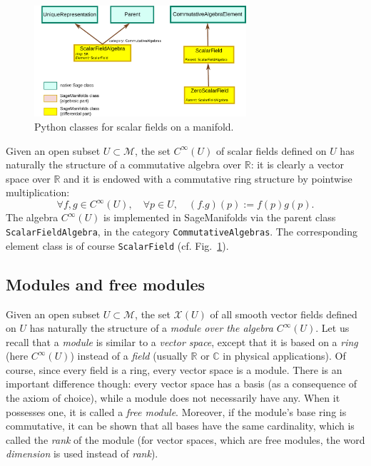 \documentclass[a4paper]{jpconf}
\newcommand{\soft}[1]{\textsf{#1}}
\newcommand{\code}[1]{\texttt{#1}}
\newcommand{\SM}{\soft{SageManifolds}}
\newcommand{\be}{\begin{equation}}
\newcommand{\ee}{\end{equation}}
\begin{document}
\begin{figure}
\begin{center}
\includegraphics[width=0.7\textwidth]{scalar_classes.pdf}
\end{center}
\caption{\label{f:scalar_classes} Python classes for scalar fields
on a manifold.}
\end{figure}

Given an open subset $U\subset\mathcal{M}$, the set $C^\infty(U)$
of scalar fields defined on $U$ has naturally the structure of a 
commutative algebra over $\mathbb{R}$: it is clearly a vector
space over $\mathbb{R}$ and it is endowed with a commutative ring structure
by pointwise multiplication:
\be
\forall f, g \in C^\infty(U),\quad \forall p\in U,\quad
(f.g)(p) := f(p) g(p) .
\ee
The algebra $C^\infty(U)$ is implemented in \SM{} via the parent
class \code{ScalarFieldAlgebra}, in the category
\code{CommutativeAlgebras}. The corresponding element class 
is of course \code{ScalarField} (cf. Fig.~\ref{f:scalar_classes}). 

\subsection{Modules and free modules} \label{s:modules}

Given an open subset $U\subset\mathcal{M}$, the set $\mathscr{X}(U)$
of all smooth vector fields defined on $U$ has naturally the structure of a 
\emph{module over the algebra} $C^\infty(U)$.
Let us recall that a \emph{module} is similar to a \emph{vector space}, except that it is based
on a \emph{ring} (here $C^\infty(U)$)
instead of a \emph{field} (usually $\mathbb{R}$ or
$\mathbb{C}$ in physical applications). Of course, since every field is a ring, every vector space is a module.
There is an important difference though: every vector space has a basis (as a 
consequence of the axiom of choice),
while a module does not necessarily have any. 
When it possesses one, it is called a \emph{free module}. 
Moreover, if the module's base ring is commutative, it can be shown that all
bases have the same
cardinality, which is called the \emph{rank} of the module 
(for vector spaces, which are free modules, the word \emph{dimension}
is used instead of \emph{rank}). 
\end{document}
